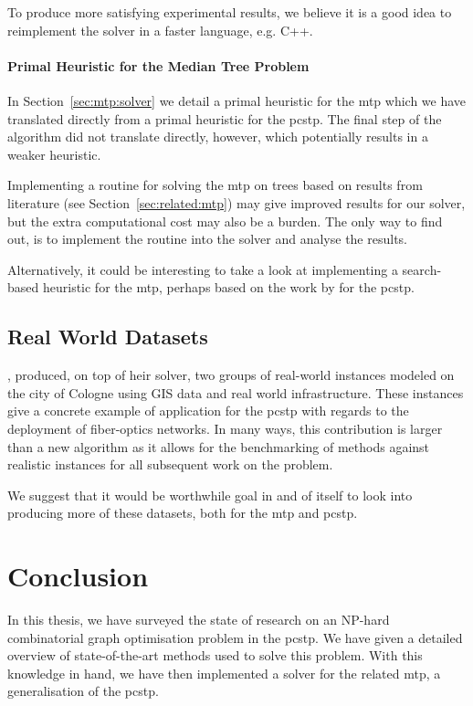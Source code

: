 To produce more satisfying experimental results, we believe it is a good idea to reimplement
the solver in a faster language, e.g. C++.

\paragraph{Primal Heuristic for the Median Tree Problem}
In Section~\ref{sec:mtp:solver} we detail a primal heuristic for the \gls{mtp}
which we have translated directly from a primal heuristic for the \gls{pcstp}.
The final step of the algorithm did not translate directly, however, which potentially
results in a weaker heuristic.

Implementing a routine for solving the \gls{mtp} on trees based on results from literature
(see Section~\ref{sec:related:mtp}) may give improved results for our solver,
but the extra computational cost may also be a burden. The only way to find out, is
to implement the routine into the solver and analyse the results.

Alternatively, it could be interesting to take a look at implementing a search-based
heuristic for the \gls{mtp}, perhaps based on the work by \citet{canuto2001local}
for the \gls{pcstp}.

\subsection{Real World Datasets}
\citet{ljubic2006algorithmic}, produced, on top of heir solver,
two groups of real-world
instances modeled on the city of Cologne using GIS data and real world infrastructure.
These instances give a concrete example of application for the \gls{pcstp} with regards
to the deployment of fiber-optics networks.
In many ways, this contribution is larger than
a new algorithm as it allows for the benchmarking of methods against realistic instances
for all subsequent work on the problem.

We suggest that it would be worthwhile goal in and of itself to look into
producing more of these
datasets, both for the \gls{mtp} and \gls{pcstp}.

\section{Conclusion}\label{sec:con:con}
In this thesis, we have surveyed the state of research on
an NP-hard combinatorial graph optimisation problem in
the \acrlong{pcstp}. We have given a detailed overview of state-of-the-art
methods used to solve this problem.
With this knowledge in hand, we have then implemented a solver for the related
\acrlong{mtp}, a generalisation of the \gls{pcstp}.

